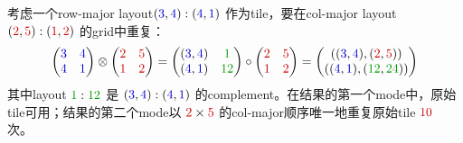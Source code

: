 \documentclass{article}
\begin{document}
考虑一个row-major layout\( (\textcolor{blue}{3},\textcolor{blue}{4}) : (\textcolor{blue}{4},\textcolor{blue}{1}) \) 作为tile，要在col-major layout \( (\textcolor{red}{2},\textcolor{red}{5}) : (\textcolor{red}{1},\textcolor{red}{2}) \) 的grid中重复：
\[
\begin{pmatrix} \textcolor{blue}{3} & \textcolor{blue}{4} \\ \textcolor{blue}{4} & \textcolor{blue}{1} \end{pmatrix}
\otimes
\begin{pmatrix} \textcolor{red}{2} & \textcolor{red}{5} \\ \textcolor{red}{1} & \textcolor{red}{2} \end{pmatrix}
=
\begin{pmatrix} (\textcolor{blue}{3},\textcolor{blue}{4}) & \textcolor{green}{1} \\ (\textcolor{blue}{4},\textcolor{blue}{1}) & \textcolor{green}{12} \end{pmatrix}
\circ
\begin{pmatrix} \textcolor{red}{2} & \textcolor{red}{5} \\ \textcolor{red}{1} & \textcolor{red}{2} \end{pmatrix}
=
\begin{pmatrix} ((\textcolor{blue}{3},\textcolor{blue}{4}), (\textcolor{red}{2},\textcolor{red}{5})) \\ ((\textcolor{blue}{4},\textcolor{blue}{1}), (\textcolor{green}{12},\textcolor{green}{24})) \end{pmatrix}
\]
其中layout \( \textcolor{green}{1} : \textcolor{green}{12} \) 是 \( (\textcolor{blue}{3},\textcolor{blue}{4}) : (\textcolor{blue}{4},\textcolor{blue}{1}) \) 的complement。在结果的第一个mode中，原始tile可用；结果的第二个mode以 \( \textcolor{red}{2} \times \textcolor{red}{5} \) 的col-major顺序唯一地重复原始tile \( \textcolor{red}{10} \) 次。
\end{document}
